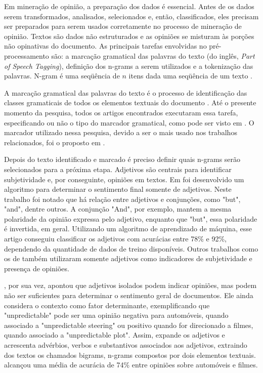 \documentclass[template.tex]{subfiles}
\begin{document}
Em mineração de opinião, a preparação dos dados é essencial. Antes de os dados serem transformados, analisados, selecionados e, então, classificados, eles precisam ser preparados para serem usados corretamente no processo de mineração de opinião. Textos são dados não estruturados e as opiniões se misturam às porções não opinativas do documento. As principais tarefas envolvidas no pré-processamento são: a marcação gramatical das palavras do texto (do inglês, \textit{Part of Speech Tagging}), definição dos n-grams a serem utilizados e a tokenização das palavras. N-gram é uma seqüência de $n$ itens dada uma seqüência de um texto \cite{dave2003mining}. 

A marcação gramatical das palavras do texto é o processo de identificação das classes gramaticais de todos os elementos textuais do documento \cite{brill1995transformation}. Até o presente momento da pesquisa, todos os artigos encontrados executaram essa tarefa, especificando ou não o tipo do marcador gramatical, como pode ser visto em . O marcador utilizado nessa pesquisa, devido a ser o mais usado nos trabalhos relacionados, foi o proposto em .

Depois do texto identificado e marcado é preciso definir quais n-grams serão selecionados para a próxima etapa. Adjetivos são centrais para identificar subjetividade e, por conseguinte, opiniões em textos. Em  foi desenvolvido um algoritmo para determinar o sentimento final somente de adjetivos. Neste trabalho foi notado que há relação entre adjetivos e conjunções, como "but", "and", dentre outros. A conjunção "And", por exemplo, mantem a mesma polaridade da opinião expressa pelo adjetivo, enquanto que "but", essa polaridade é invertida, em geral. Utilizando um algoritmo de aprendizado de máquina, esse artigo conseguiu classificar os adjetivos com acurácias entre 78\% e 92\%, dependendo da quantidade de dados de treino disponíveis. Outros trabalhos como os de  também utilizaram somente adjetivos como indicadores de subjetividade e presença de opiniões.

, por sua vez, apontou que adjetivos isolados podem indicar opiniões, mas podem não ser suficientes para determinar o sentimento geral de documentos. Ele ainda considera o contexto como fator determinante, exemplificando que "unpredictable" pode ser uma opinião negativa para automóveis, quando associado a "unpredictable steering" ou positivo quando for direcionado a filmes, quando associado a "unpredictable plot". Assim,  expande os adjetivos e acrescenta advérbios, verbos e substantivos associados aos adjetivos, extraindo dos textos os chamados bigrams, n-grams compostos por dois elementos textuais.  alcançou uma média de acurácia de 74\% entre opiniões sobre automóveis e filmes. 
\end{document}
